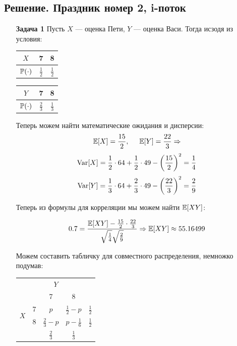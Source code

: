 \documentclass[12pt, a4paper]{article}\usepackage[]{graphicx}\usepackage[]{color}
\begin{document}
\subsection{Решение. Праздник номер 2, i-поток}

\begin{enumerate}
\item[\textbf{Задача 1}]
Пусть $X$ — оценка Пети, $Y$ — оценка Васи. Тогда исзодя из условия:
\begin{center}

\begin{tabular}{c|c|c}
$X$ & 7 & 8\\
\hline
$\P(\cdot)$ & $\frac{1}{2}$ & $\frac{1}{2}$
\end{tabular}
\hspace{1cm}
\begin{tabular}{c|c|c}
$Y$ & 7 & 8\\
\hline
$\P(\cdot)$ & $\frac{2}{3}$ & $\frac{1}{3}$
\end{tabular}
\end{center}

Теперь можем найти математические ожидания и дисперсии:
\[
\E[X] = \frac{15}{2}, \hspace{0.5cm} \E[Y] = \frac{22}{3} \Rightarrow
\]
\[
\Var[X] = \frac{1}{2}\cdot 64 + \frac{1}{2}\cdot 49 - \left(\frac{15}{2}\right)^2 = \frac{1}{4}
\]
\[
\Var[Y] = \frac{1}{3}\cdot 64 + \frac{2}{3}\cdot 49 - \left(\frac{22}{3}\right)^2 = \frac{2}{9}
\]

Теперь из формулы для корреляции мы можем найти $\E[XY]$:

\[
0.7 = \frac{\E[XY]-\frac{15}{2}\cdot\frac{22}{3}}{\sqrt{\frac{1}{4}}\sqrt{\frac{2}{9}}} \Rightarrow \E[XY] \approx 55.16499
\]

Можем составить табличку для совместного распределения, немножко подумав:

\begin{center}
\begin{tabular}{c|c|c|c|c|}
\multicolumn{5}{c}{\hspace*{1cm}$Y$}\\
\cline{2-5}
\multirow{4}{*}{$X$}  & &  7 & 8 &  \\
\cline{2-5}
& 7 & $p$ & $\frac{1}{2}-p$&$\frac{1}{2}$\\
\cline{2-5}
& 8  & $\frac{2}{3}-p$&$p-\frac{1}{6}$ & $\frac{1}{2}$\\
\cline{2-5}
& & $\frac{2}{3}$ & $\frac{1}{3}$& \\
\cline{2-5}


\end{tabular}
\end{center}
\end{enumerate}
\end{document}
